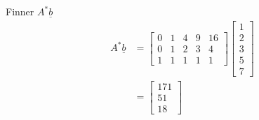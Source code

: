 \documentclass[11pt, a4paper, norsk]{NTNUoving}
\begin{document}
\begin{oppgave}
\begin{punkt}
           Finner $A^{*}\underline{b}$
           \begin{align*}
               A^{*}\underline{b} &= \begin{bmatrix}
                   0 & 1 & 4 & 9 & 16 \\
                   0 & 1 & 2 & 3 & 4 \\
                   1 & 1 & 1 & 1 & 1
               \end{bmatrix}\begin{bmatrix}
                   1 \\
                   2 \\
                   3 \\
                   5 \\
                   7
               \end{bmatrix}
               \\
                                  &= \begin{bmatrix}
                                      171 \\
                                      51 \\
                                      18
                                  \end{bmatrix}
           \end{align*}
           

\end{punkt}
\end{oppgave}
\end{document}
